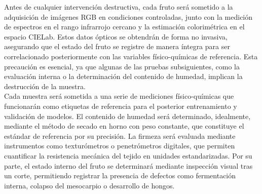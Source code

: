 Antes de cualquier intervención destructiva, cada fruto será sometido a la adquisición de imágenes RGB en condiciones controladas, junto con la medición de espectros en el rango infrarrojo cercano y la estimación colorimétrica en el espacio CIELab. Estos datos ópticos se obtendrán de forma no invasiva, asegurando que el estado del fruto se registre de manera íntegra para ser correlacionado posteriormente con las variables físico-químicas de referencia. Esta precaución es esencial, ya que algunas de las pruebas subsiguientes, como la evaluación interna o la determinación del contenido de humedad, implican la destrucción de la muestra.\\

Cada muestra será sometida a una serie de mediciones físico-químicas que funcionarán como etiquetas de referencia para el posterior entrenamiento y validación de modelos. El contenido de humedad será determinado, idealmente, mediante el método de secado en horno con peso constante, que constituye el estándar de referencia por su precisión. La firmeza será evaluada mediante instrumentos como texturómetros o penetrómetros digitales, que permiten cuantificar la resistencia mecánica del tejido en unidades estandarizadas. Por su parte, el estado interno del fruto se determinará mediante inspección visual tras un corte, permitiendo registrar la presencia de defectos como fermentación interna, colapso del mesocarpio o desarrollo de hongos.

